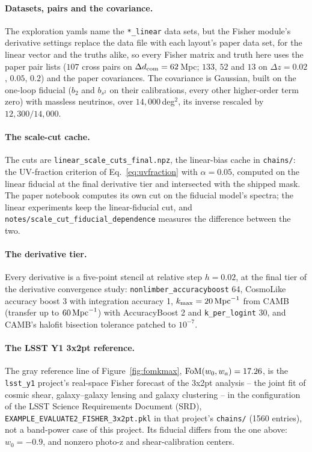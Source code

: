 \documentclass[11pt]{article}
\begin{document}
\paragraph{Datasets, pairs and the covariance.}
The exploration yamls name the \texttt{*\_linear} data sets, but
the Fisher module's derivative settings replace the data file with
each layout's paper data set, for the linear vector and the truths
alike, so every Fisher matrix and truth here
uses the paper pair lists ($107$ cross pairs on
$\Delta d_{\rm com} = 62$\,Mpc; $133$, $52$ and $13$ on
$\Delta z = 0.02$, $0.05$, $0.2$) and the paper covariances.  The
covariance is Gaussian, built on the one-loop fiducial ($b_2$ and
$b_{s^2}$ on their calibrations, every other higher-order term zero)
with massless neutrinos, over $14{,}000$\,deg$^2$, its inverse
rescaled by $12{,}300/14{,}000$.

\paragraph{The scale-cut cache.}
The cuts are \texttt{linear\_scale\_cuts\_final.npz},
the linear-bias cache in \texttt{chains/}: the
UV-fraction criterion of Eq.~\eqref{eq:uvfraction} with
$\alpha = 0.05$, computed on the linear fiducial at the final
derivative tier and intersected with the shipped mask.  The paper
notebook computes its own cut on the fiducial model's spectra; the
linear experiments keep the linear-fiducial cut, and
\texttt{notes/scale\_cut\_fiducial\_dependence} measures the
difference between the two.

\paragraph{The derivative tier.}
Every derivative is a five-point stencil at relative step $h = 0.02$,
at the final tier of the derivative convergence study:
\texttt{nonlimber\_accuracyboost} 64, CosmoLike accuracy boost 3 with
integration accuracy 1, $k_{\rm max} = 20\,{\rm Mpc}^{-1}$ from CAMB
(transfer up to $60\,{\rm Mpc}^{-1}$) with AccuracyBoost 2 and
\texttt{k\_per\_logint} 30, and CAMB's halofit bisection tolerance
patched to $10^{-7}$.

\paragraph{The LSST Y1 3x2pt reference.}
The gray reference line of Figure~\ref{fig:fomkmax},
${\rm FoM}(w_0, w_a) = 17.26$, is the \texttt{lsst\_y1} project's
real-space Fisher forecast of the 3x2pt analysis -- the joint fit of
cosmic shear, galaxy--galaxy lensing and galaxy clustering -- in the
configuration of the LSST Science Requirements Document (SRD),
\texttt{EXAMPLE\_EVALUATE2\_FISHER\_3x2pt.pkl} in that project's
\texttt{chains/} (1560 entries), not a band-power case of this
project.  Its fiducial
differs from the one above: $w_0 = -0.9$, and nonzero photo-z and
shear-calibration centers.
\end{document}
